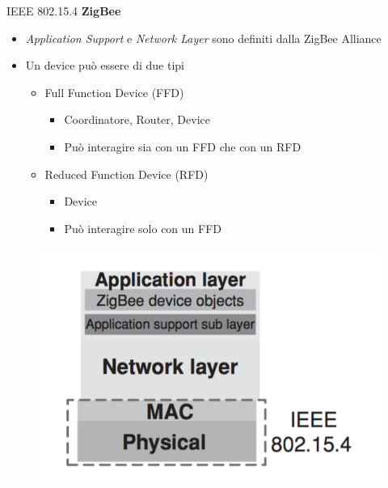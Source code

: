 \begin{frame}{IEEE 802.15.4}
\textbf{ZigBee}
\begin{itemize}
	\item \textit{Application Support} e \textit{Network Layer} sono definiti dalla ZigBee Alliance
	\item Un device può essere di due tipi
	\begin{itemize}
		\item Full Function Device (FFD)
			\begin{itemize}
				\item Coordinatore, Router, Device
				\item Può interagire sia con un FFD che con un RFD
			\end{itemize}
		\item Reduced Function Device (RFD)
			\begin{itemize}
				\item Device
				\item Può interagire solo con un FFD
			\end{itemize}
	\end{itemize}
\end{itemize}
	\begin{figure}[h] 
		\includegraphics[scale=0.3,cfbox=blue_slides 1pt 0pt]{imgs/zbprot.png}
	\end{figure}
\end{frame}


